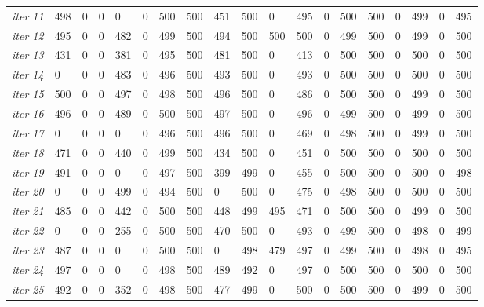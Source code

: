 \documentclass[12pt]{article}
\begin{document}
\begin{table}[ht]
{\begin{tabular}{lllllllllllllllllll}
									{\textit{iter 11}} & 498 &   0 &   0 &   0 &   0 & 500 & 500 & 451 & 500 &   0 & 495 &   0 & 500 & 500 &   0 & 499 &   0 & 495 \\ 
									{\textit{iter 12}} & 495 &   0 &   0 & 482 &   0 & 499 & 500 & 494 & 500 & 500 & 500 &   0 & 499 & 500 &   0 & 499 &   0 & 500 \\ 
									{\textit{iter 13}} & 431 &   0 &   0 & 381 &   0 & 495 & 500 & 481 & 500 &   0 & 413 &   0 & 500 & 500 &   0 & 500 &   0 & 500 \\ 
									{\textit{iter 14}} &   0 &   0 &   0 & 483 &   0 & 496 & 500 & 493 & 500 &   0 & 493 &   0 & 500 & 500 &   0 & 500 &   0 & 500 \\ 
									{\textit{iter 15}} & 500 &   0 &   0 & 497 &   0 & 498 & 500 & 496 & 500 &   0 & 486 &   0 & 500 & 500 &   0 & 499 &   0 & 500 \\ 
									{\textit{iter 16}} & 496 &   0 &   0 & 489 &   0 & 500 & 500 & 497 & 500 &   0 & 496 &   0 & 499 & 500 &   0 & 499 &   0 & 500 \\ 
									{\textit{iter 17}} &   0 &   0 &   0 &   0 &   0 & 496 & 500 & 496 & 500 &   0 & 469 &   0 & 498 & 500 &   0 & 499 &   0 & 500 \\ 
									{\textit{iter 18}} & 471 &   0 &   0 & 440 &   0 & 499 & 500 & 434 & 500 &   0 & 451 &   0 & 500 & 500 &   0 & 500 &   0 & 500 \\ 
									{\textit{iter 19}} & 491 &   0 &   0 &   0 &   0 & 497 & 500 & 399 & 499 &   0 & 455 &   0 & 500 & 500 &   0 & 500 &   0 & 498 \\ 
									{\textit{iter 20}} &   0 &   0 &   0 & 499 &   0 & 494 & 500 &   0 & 500 &   0 & 475 &   0 & 498 & 500 &   0 & 500 &   0 & 500 \\ 
									{\textit{iter 21}} & 485 &   0 &   0 & 442 &   0 & 500 & 500 & 448 & 499 & 495 & 471 &   0 & 500 & 500 &   0 & 499 &   0 & 500 \\ 
									{\textit{iter 22}} &   0 &   0 &   0 & 255 &   0 & 500 & 500 & 470 & 500 &   0 & 493 &   0 & 499 & 500 &   0 & 498 &   0 & 499 \\ 
									{\textit{iter 23}} & 487 &   0 &   0 &   0 &   0 & 500 & 500 &   0 & 498 & 479 & 497 &   0 & 499 & 500 &   0 & 498 &   0 & 495 \\ 
									{\textit{iter 24}} & 497 &   0 &   0 &   0 &   0 & 498 & 500 & 489 & 492 &   0 & 497 &   0 & 500 & 500 &   0 & 500 &   0 & 500 \\ 
									{\textit{iter 25}} & 492 &   0 &   0 & 352 &   0 & 498 & 500 & 477 & 499 &   0 & 500 &   0 & 500 & 500 &   0 & 499 &   0 & 500 \\ 

\end{tabular}}
\end{table}
\end{document}
